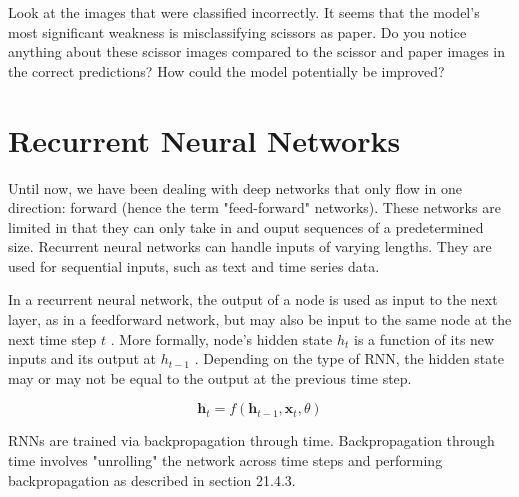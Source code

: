 \documentclass{article}
\begin{document}
\FloatBarrier

Look at the images that were classified incorrectly. It seems that the model's most significant weakness is misclassifying scissors as paper. Do you notice anything about these scissor images compared to the scissor and paper images in the correct predictions? How could the model potentially be improved?

\section{Recurrent Neural Networks}

Until now, we have been dealing with deep networks that only flow in one direction: forward (hence the term "feed-forward" networks). These networks are limited in that they can only take in and ouput sequences of a predetermined size. Recurrent neural networks can handle inputs of varying lengths. They are used for sequential inputs, such as text and time series data.

In a recurrent neural network, the output of a node is used as input to the next layer, as in a feedforward network, but may also be input to the same node at the next time step \(t\) \cite{hands-on-ml}. More formally, node's hidden state \(h_t\) is a function of its new inputs and its output at \(h_{t-1}\) \cite{Goodfellow-et-al-2016}. Depending on the type of RNN, the hidden state may or may not be equal to the output at the previous time step.

\[\bm{h}_t = f(\bm{h}_{t-1},\bm{x}_t,\theta)\]


RNNs are trained via backpropagation through time. Backpropagation through time involves "unrolling" the network across time steps and performing backpropagation as described in section 21.4.3. 
\end{document}
